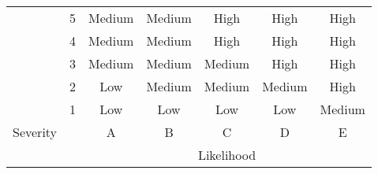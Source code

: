 \begin{table}[]
\begin{tabular}{cc|c|c|c|c|c|}

\multicolumn{1}{|c|}{}                           & 5                                             & \cellcolor[HTML]{F8FF00}Medium & \cellcolor[HTML]{F8FF00}Medium & \cellcolor[HTML]{FD6864}High   & \cellcolor[HTML]{FD6864}High   & \cellcolor[HTML]{FD6864}High   \\ \cline{2-7} 
\multicolumn{1}{|c|}{}                           & 4                                             & \cellcolor[HTML]{F8FF00}Medium & \cellcolor[HTML]{F8FF00}Medium & \cellcolor[HTML]{FD6864}High   & \cellcolor[HTML]{FD6864}High   & \cellcolor[HTML]{FD6864}High   \\ \cline{2-7} 
\multicolumn{1}{|c|}{}                           & 3                                             & \cellcolor[HTML]{F8FF00}Medium & \cellcolor[HTML]{F8FF00}Medium & \cellcolor[HTML]{F8FF00}Medium & \cellcolor[HTML]{FD6864}High   & \cellcolor[HTML]{FD6864}High   \\ \cline{2-7} 
\multicolumn{1}{|c|}{}                           & 2                                             & \cellcolor[HTML]{34FF34}Low    & \cellcolor[HTML]{F8FF00}Medium & \cellcolor[HTML]{F8FF00}Medium & \cellcolor[HTML]{F8FF00}Medium & \cellcolor[HTML]{FD6864}High   \\ \cline{2-7} 
\multicolumn{1}{|c|}{}                           & 1                                             & \cellcolor[HTML]{34FF34}Low    & \cellcolor[HTML]{34FF34}Low    & \cellcolor[HTML]{34FF34}Low    & \cellcolor[HTML]{34FF34}Low    & \cellcolor[HTML]{F8FF00}Medium \\ \cline{2-7} 
\multicolumn{1}{|c|}{\multirow{-6}{*}{Severity}} & \cellcolor[HTML]{C0C0C0}                      & A                              & B                              & C                              & D                              & E                              \\ 
\multicolumn{1}{l}{\cellcolor[HTML]{FFFFFF}}     & \multicolumn{1}{l|}{\cellcolor[HTML]{FFFFFF}} & \multicolumn{5}{c|}{Likelihood}                                                                                                                                    \\ \cline{3-7} 
\end{tabular}
\end{table}


